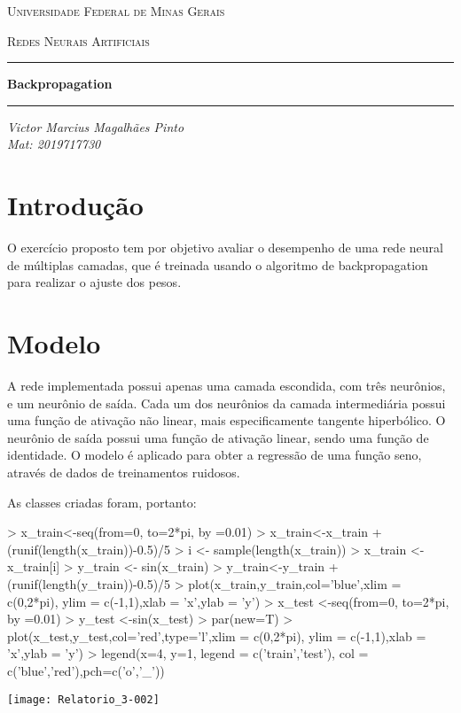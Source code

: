 \documentclass{article}
\begin{document}


\begin{center}

{\scshape\Large Universidade Federal de Minas Gerais \par}
{\scshape\large Redes Neurais Artificiais \par}
\vspace{5cm}

\hrule
\hfill

{\huge \textbf{Backpropagation}\par}
\hfill
\hrule
\hfill

\vspace{3cm}

{\large\itshape Victor Marcius Magalhães Pinto\\Mat: 2019717730\par}

\vspace{2cm}

\end{center}

\newpage

\section{Introdução}

O exercício proposto tem por objetivo avaliar o desempenho de uma rede neural de múltiplas camadas, que é treinada usando o algoritmo de backpropagation para realizar o ajuste dos pesos.


\section{Modelo}

A rede implementada possui apenas uma camada escondida, com três neurônios, e um neurônio de saída. Cada um dos neurônios da camada intermediária possui uma função de ativação não linear, mais especificamente tangente hiperbólico. O neurônio de saída possui uma função de ativação linear, sendo uma função de identidade. O modelo é aplicado para obter a regressão de uma função seno, através de dados de treinamentos ruidosos.


As classes criadas foram, portanto:

\begin{Schunk}
\begin{Sinput}
> x_train<-seq(from=0, to=2*pi, by =0.01)
> x_train<-x_train + (runif(length(x_train))-0.5)/5
> i <- sample(length(x_train))
> x_train <- x_train[i]
> y_train <- sin(x_train)
> y_train<-y_train + (runif(length(y_train))-0.5)/5
> plot(x_train,y_train,col='blue',xlim = c(0,2*pi), ylim = c(-1,1),xlab = 'x',ylab = 'y')
> x_test <-seq(from=0, to=2*pi, by =0.01)
> y_test <-sin(x_test)
> par(new=T)
> plot(x_test,y_test,col='red',type='l',xlim = c(0,2*pi), ylim = c(-1,1),xlab = 'x',ylab = 'y')
> legend(x=4, y=1, legend = c('train','test'), col = c('blue','red'),pch=c('o','_'))
\end{Sinput}
\end{Schunk}
\texttt{[image: Relatorio\_3-002]}
\end{document}
